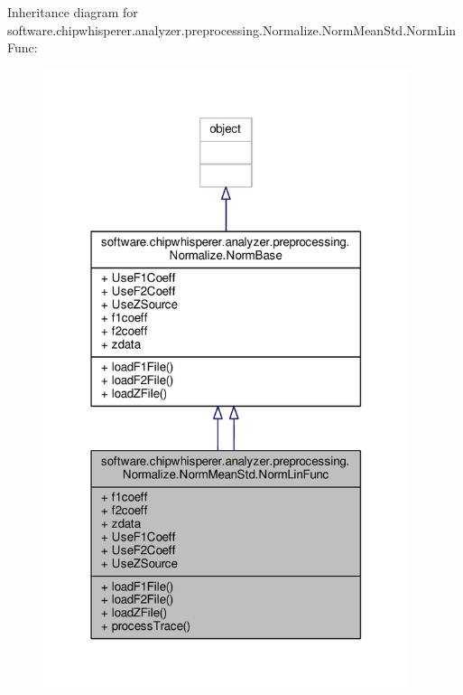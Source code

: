 Inheritance diagram for software.\+chipwhisperer.\+analyzer.\+preprocessing.\+Normalize.\+Norm\+Mean\+Std.\+Norm\+Lin\+Func\+:\nopagebreak
\begin{figure}[H]
\begin{center}
\leavevmode
\includegraphics[width=304pt]{de/d20/classsoftware_1_1chipwhisperer_1_1analyzer_1_1preprocessing_1_1Normalize_1_1NormMeanStd_1_1NormLinFunc__inherit__graph}
\end{center}
\end{figure}


